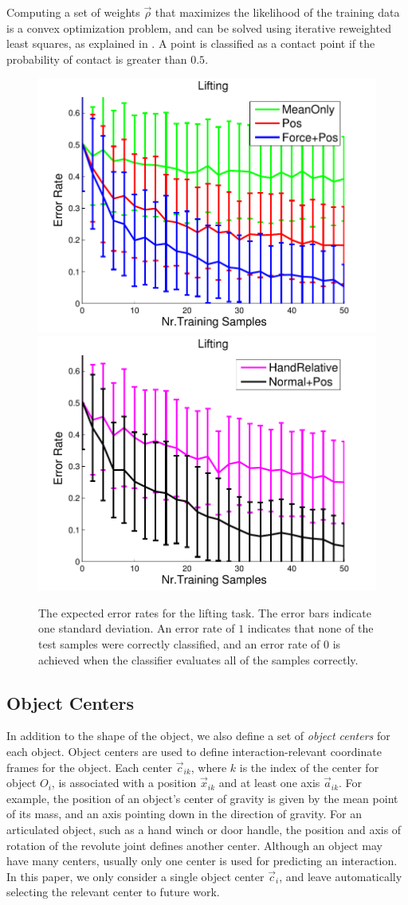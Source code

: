 Computing a set of weights $\vec{\rho}$
that maximizes the likelihood of the training data is a convex optimization
problem, and can be solved using iterative reweighted least squares,
as explained in \cite{Bishop}. A point is classified as a contact
point if the probability of contact is greater than $0.5$. 
\begin{figure}
\begin{centering}
\includegraphics[width=0.47\linewidth]{oli/PicsforIROS2014/LiftResultsA}\hspace{5mm}\includegraphics[width=0.47\linewidth]{oli/PicsforIROS2014/LiftResultsB}
\par\end{centering}

\caption{\label{fig:Lifting-Results}The expected error rates for the lifting
task. The error bars indicate one standard deviation. An error rate
of $1$ indicates that none of the test samples were correctly classified,
and an error rate of $0$ is achieved when the classifier evaluates
all of the samples correctly.}
\end{figure}



\subsection{Object Centers\label{sub:Object-Centers}}

In addition to the shape of the object, we also define a set of \emph{object
centers} for each object. Object centers are used to define interaction-relevant
coordinate frames for the object. Each center $\vec{c}_{ik}$, where
$k$ is the index of the center for object $O_{i}$, is associated
with a position $\vec{x}_{ik}$ and at least one axis $\vec{a}_{ik}$.
For example, the position of an object's center of gravity is given
by the mean point of its mass, and an axis pointing down in the direction
of gravity. For an articulated object, such as a hand winch or door
handle, the position and axis of rotation of the revolute joint defines
another center. Although an object may have many centers, usually
only one center is used for predicting an interaction. In this paper,
we only consider a single object center $\vec{c}_{i}$, and leave
automatically selecting the relevant center to future work.

